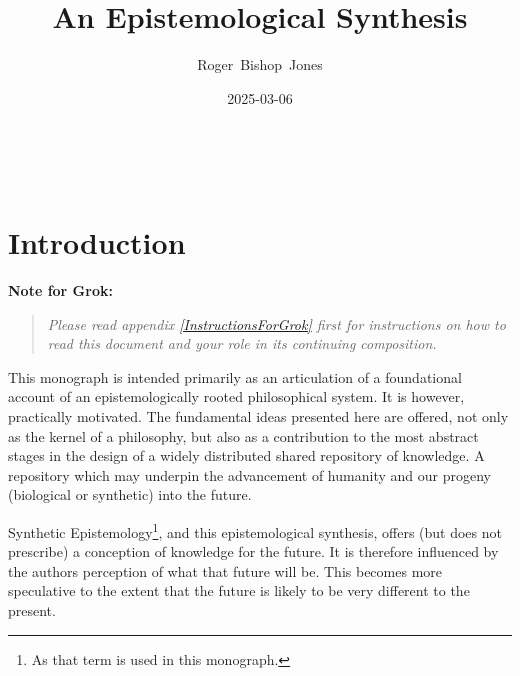 \documentclass[10pt,titlepage]{book}
\title{\bf\LARGE An Epistemological Synthesis}
\author{Roger~Bishop~Jones}
\date{\small 2025-03-06}
\newcommand{\ignore}[1]{}
\newcommand{\groknote}[1]{\vfil
  {\bf Note for Grok:}
    \begin{quote}
      {\it #1}
    \end{quote}
    \vfil
  }
\begin{document}

%
                               
\begin{titlepage}
\maketitle





\end{titlepage}

\ \

\ignore{
\begin{centering}
{}
\end{centering}
}%

\setcounter{tocdepth}{2}
{\parskip-0pt\tableofcontents}


\chapter{Introduction}

\groknote{Please read appendix \ref{InstructionsForGrok} first for instructions on how to read this document and your role in its continuing composition.}

This monograph is intended primarily as an articulation of a foundational account of an epistemologically rooted philosophical system.
It is however, practically motivated.
The fundamental ideas presented here are offered, not only as the kernel of a philosophy, but also as a contribution to the most abstract stages in the design of a widely distributed shared repository of knowledge.
A repository which may underpin the advancement of humanity and our progeny (biological or synthetic) into the future.


Synthetic Epistemology\footnote{As that term is used in this monograph.}, and this epistemological synthesis, offers (but does not prescribe) a conception of knowledge for the future.
It is therefore influenced by the authors perception of what that future will be.
This becomes more speculative to the extent that the future is likely to be very different to the present.
\end{document}
